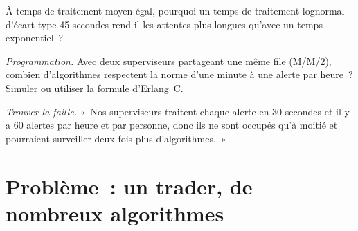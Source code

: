 \begin{exercise}[$\star\star$]\label{exo:in:trader:6}
À temps de traitement moyen égal, pourquoi un temps de traitement lognormal d'écart-type 45 secondes rend-il les attentes
plus longues qu'avec un temps exponentiel~?
\end{exercise}

\begin{exercise}[$\star\star\star$]\label{exo:in:trader:7}
\emph{Programmation.} Avec deux superviseurs partageant une même file (M/M/2), combien d'algorithmes respectent la norme d'une minute à une
alerte par heure~? Simuler ou utiliser la formule d'Erlang~C.
\end{exercise}

\begin{exercise}[$\star\star\star$]\label{exo:in:trader:8}
\emph{Trouver la faille.} «~Nos superviseurs traitent chaque alerte en 30 secondes et il y a 60 alertes par heure et par personne, donc
ils ne sont occupés qu'à moitié et pourraient surveiller deux fois plus d'algorithmes.~»
\end{exercise}

\section{Problème~: un trader, de nombreux algorithmes}

